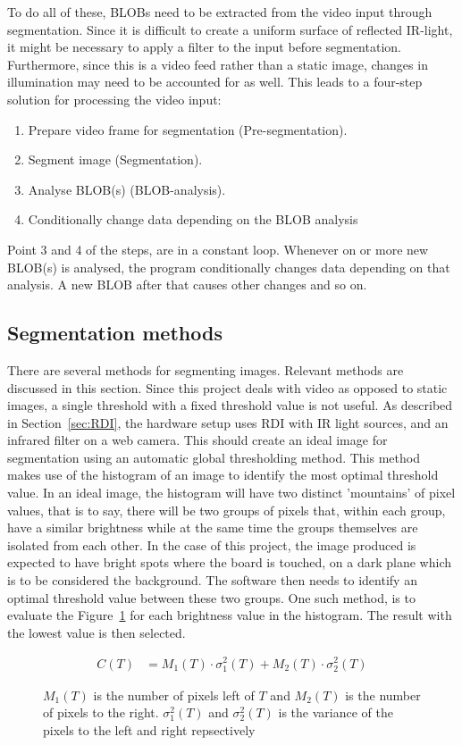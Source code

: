  To do all of these, BLOBs need to be extracted from the video input through segmentation. Since it is difficult to create a uniform surface of reflected IR-light, it might be necessary to apply a filter to the input before segmentation. Furthermore, since this is a video feed rather than a static image, changes in illumination may need to be accounted for as well. This leads to a four-step solution for processing the video input:
\begin{enumerate}
\item Prepare video frame for segmentation (Pre-segmentation).
\item Segment image (Segmentation).
\item Analyse BLOB(s) (BLOB-analysis).
\item Conditionally change data depending on the BLOB analysis
\end{enumerate}
Point 3 and 4 of the steps, are in a constant loop. Whenever on or more new BLOB(s) is analysed, the program conditionally changes data depending on that analysis. A new BLOB after that causes other changes and so on.

\subsection{Segmentation methods}
There are several methods for segmenting images. Relevant methods are discussed in this section. Since this project deals with video as opposed to static images, a single threshold with a fixed threshold value is not useful. As described in Section~\ref{sec:RDI}, the hardware setup uses RDI with IR light sources, and an  infrared filter on a web camera. This should create an ideal image for segmentation using an automatic global thresholding method. This method makes use of the histogram of an image to identify the most optimal threshold value\citep{Moeslund2012c4}. In an ideal image, the histogram will have two distinct 'mountains' of pixel values, that is to say, there will be two groups of pixels that, within each group, have a similar brightness while at the same time the groups themselves are isolated from each other. In the case of this project, the image produced is expected to have bright spots where the board is touched, on a dark plane which is to be considered the background. The software then needs to identify an optimal threshold value between these two groups. One such method, is to evaluate the Figure~\ref{eq:otsu} for each brightness value in the histogram. The result with the lowest value is then selected.
\begin{figure}[h]
	\begin{align*}
	C(T)&=M_1(T)\cdot\sigma_1^2(T)+M_2(T)\cdot\sigma_2^2(T)
	\end{align*}
	\caption{$M_1(T)$ is the number of pixels left of $T$ and $M_2(T)$ is the number of pixels to the right. $\sigma_1^2(T)$ and $\sigma_2^2(T)$ is the variance of the pixels to the left and right repsectively \label{eq:otsu} \citep[p. 61]{moeslund_introduction_2012_chapter_5}}
\end{figure}

